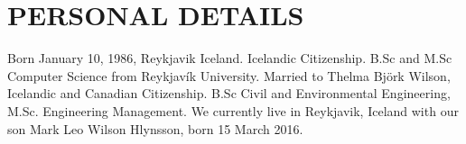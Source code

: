 \section{PERSONAL DETAILS}
Born January 10, 1986, Reykjavik Iceland.  Icelandic Citizenship. B.Sc and M.Sc
Computer Science from Reykjavík University.  Married to Thelma Björk Wilson,
Icelandic and Canadian Citizenship. B.Sc Civil and Environmental Engineering,
M.Sc. Engineering Management. We currently live in Reykjavik, Iceland with our
son Mark Leo Wilson Hlynsson, born 15 March 2016.
